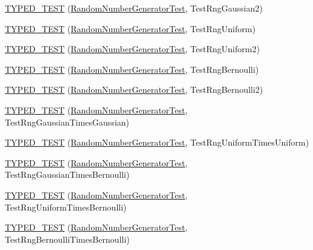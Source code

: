 \begin{DoxyCompactItemize}
\item 
\hyperlink{namespacecaffe_abd7fca68a0a0cdb31958b99041800780}{T\+Y\+P\+E\+D\+\_\+\+T\+E\+S\+T} (\hyperlink{classcaffe_1_1_random_number_generator_test}{Random\+Number\+Generator\+Test}, Test\+Rng\+Gaussian2)
\item 
\hyperlink{namespacecaffe_aae0f55793eeea20a85eabcb3920a0231}{T\+Y\+P\+E\+D\+\_\+\+T\+E\+S\+T} (\hyperlink{classcaffe_1_1_random_number_generator_test}{Random\+Number\+Generator\+Test}, Test\+Rng\+Uniform)
\item 
\hyperlink{namespacecaffe_a775aa1f3a6240a60d51d269f0e639acf}{T\+Y\+P\+E\+D\+\_\+\+T\+E\+S\+T} (\hyperlink{classcaffe_1_1_random_number_generator_test}{Random\+Number\+Generator\+Test}, Test\+Rng\+Uniform2)
\item 
\hyperlink{namespacecaffe_a9b14f98af65e2b1598ccb0b6a234e17b}{T\+Y\+P\+E\+D\+\_\+\+T\+E\+S\+T} (\hyperlink{classcaffe_1_1_random_number_generator_test}{Random\+Number\+Generator\+Test}, Test\+Rng\+Bernoulli)
\item 
\hyperlink{namespacecaffe_a05591495ffdafc5579f8861530d2736c}{T\+Y\+P\+E\+D\+\_\+\+T\+E\+S\+T} (\hyperlink{classcaffe_1_1_random_number_generator_test}{Random\+Number\+Generator\+Test}, Test\+Rng\+Bernoulli2)
\item 
\hyperlink{namespacecaffe_a4e1e79387cc1a8e137d5b705cebf798f}{T\+Y\+P\+E\+D\+\_\+\+T\+E\+S\+T} (\hyperlink{classcaffe_1_1_random_number_generator_test}{Random\+Number\+Generator\+Test}, Test\+Rng\+Gaussian\+Times\+Gaussian)
\item 
\hyperlink{namespacecaffe_aa30ff03a25431ac45216cfddc9ac96b6}{T\+Y\+P\+E\+D\+\_\+\+T\+E\+S\+T} (\hyperlink{classcaffe_1_1_random_number_generator_test}{Random\+Number\+Generator\+Test}, Test\+Rng\+Uniform\+Times\+Uniform)
\item 
\hyperlink{namespacecaffe_a68984fa7d28ecc1f0e4351145f71718f}{T\+Y\+P\+E\+D\+\_\+\+T\+E\+S\+T} (\hyperlink{classcaffe_1_1_random_number_generator_test}{Random\+Number\+Generator\+Test}, Test\+Rng\+Gaussian\+Times\+Bernoulli)
\item 
\hyperlink{namespacecaffe_a000e358a08b2d2439ed8ce703d774116}{T\+Y\+P\+E\+D\+\_\+\+T\+E\+S\+T} (\hyperlink{classcaffe_1_1_random_number_generator_test}{Random\+Number\+Generator\+Test}, Test\+Rng\+Uniform\+Times\+Bernoulli)
\item 
\hyperlink{namespacecaffe_a21d86d58edb92bd3ff4f26425ec88f8c}{T\+Y\+P\+E\+D\+\_\+\+T\+E\+S\+T} (\hyperlink{classcaffe_1_1_random_number_generator_test}{Random\+Number\+Generator\+Test}, Test\+Rng\+Bernoulli\+Times\+Bernoulli)

\end{DoxyCompactItemize}
